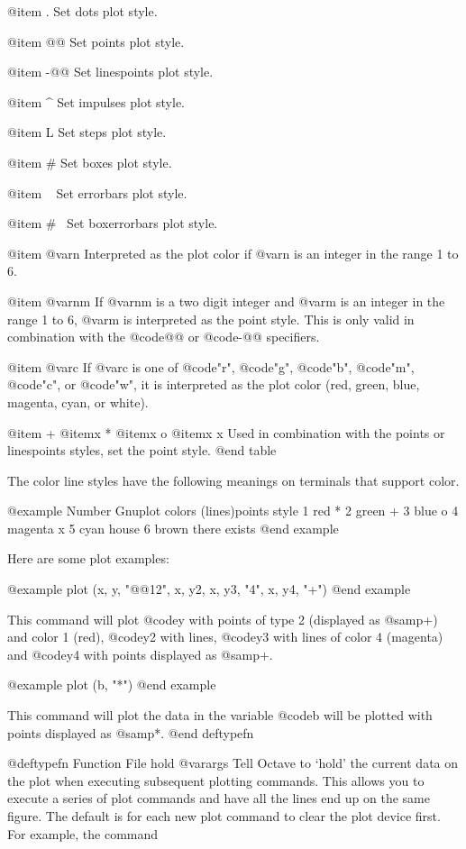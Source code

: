 @item .
Set dots plot style.

@item @@
Set points plot style.

@item -@@
Set linespoints plot style.

@item ^
Set impulses plot style.

@item L
Set steps plot style.

@item #
Set boxes plot style.

@item ~
Set errorbars plot style.

@item #~
Set boxerrorbars plot style.

@item @var{n}
Interpreted as the plot color if @var{n} is an integer in the range 1 to
6.

@item @var{nm}
If @var{nm} is a two digit integer and @var{m} is an integer in the
range 1 to 6, @var{m} is interpreted as the point style.  This is only
valid in combination with the @code{@@} or @code{-@@} specifiers.

@item @var{c}
If @var{c} is one of @code{"r"}, @code{"g"}, @code{"b"}, @code{"m"},
@code{"c"}, or @code{"w"}, it is interpreted as the plot color (red,
green, blue, magenta, cyan, or white).

@item +
@itemx *
@itemx o
@itemx x
Used in combination with the points or linespoints styles, set the point
style.
@end table

The color line styles have the following meanings on terminals that
support color.

@example
Number  Gnuplot colors  (lines)points style
  1       red                   *
  2       green                 +
  3       blue                  o
  4       magenta               x
  5       cyan                house
  6       brown            there exists
@end example

Here are some plot examples:

@example
plot (x, y, "@@12", x, y2, x, y3, "4", x, y4, "+")
@end example

This command will plot @code{y} with points of type 2 (displayed as
@samp{+}) and color 1 (red), @code{y2} with lines, @code{y3} with lines of
color 4 (magenta) and @code{y4} with points displayed as @samp{+}.

@example
plot (b, "*")
@end example

This command will plot the data in the variable @code{b} will be plotted
with points displayed as @samp{*}.
@end deftypefn

@deftypefn {Function File} {} hold @var{args}
Tell Octave to `hold' the current data on the plot when executing
subsequent plotting commands.  This allows you to execute a series of
plot commands and have all the lines end up on the same figure.  The
default is for each new plot command to clear the plot device first.
For example, the command

